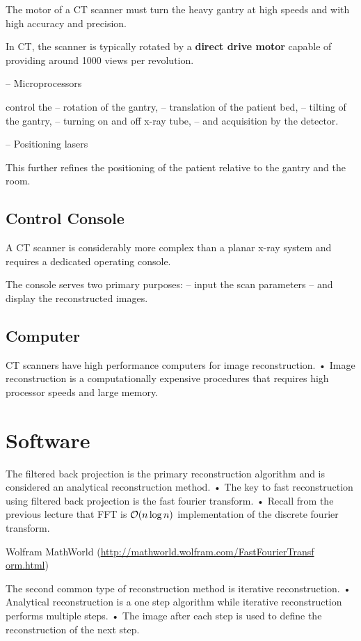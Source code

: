 \documentclass[UTF8,a4paper,11pt]{book}
\theoremstyle{mystyle}{
  \newtheorem{example}{Example}
}
\begin{document}
 The motor of a CT scanner must turn the
heavy gantry at high speeds and with high
accuracy and precision.

 In CT, the scanner is typically rotated by a
\textbf{direct drive motor} capable of providing
around 1000 views per revolution.

– Microprocessors

control the
– rotation of the gantry,
– translation of the patient bed,
– tilting of the gantry,
– turning on and off x-ray tube,
– and acquisition by the detector.


– Positioning lasers

This further refines the positioning of the
patient relative to the gantry and the room.

\subsection{Control Console}
A CT scanner is considerably more complex
than a planar x-ray system and requires a
dedicated operating console.

The console serves two primary purposes:
– input the scan parameters
– and display the reconstructed images.

\subsection{Computer}

 CT scanners have high performance
computers for image reconstruction.
• Image reconstruction is a computationally
expensive procedures that requires high
processor speeds and large memory.

\section{Software}

 The filtered back projection is the primary
reconstruction algorithm and is considered an
analytical reconstruction method.
• The key to fast reconstruction using filtered
back projection is the fast fourier transform.
• Recall from the previous lecture that FFT is
${\cal O}(n \log n)$ implementation of the discrete
fourier transform.

Wolfram MathWorld
(\url{http://mathworld.wolfram.com/FastFourierTransf
orm.html})

The second common type of reconstruction
method is iterative reconstruction.
• Analytical reconstruction is a one step
algorithm while iterative reconstruction
performs multiple steps.
• The image after each step is used to define
the reconstruction of the next step.
\end{document}
